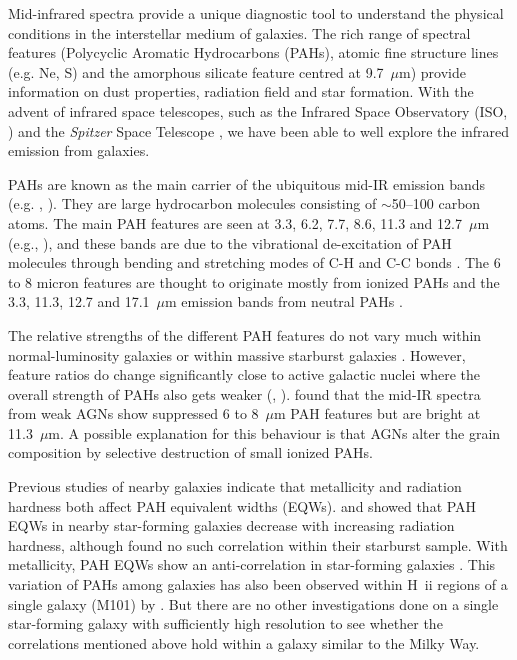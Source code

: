 Mid-infrared spectra provide a unique diagnostic tool to understand the physical conditions in the interstellar medium of galaxies. 
The rich range of spectral features (Polycyclic Aromatic Hydrocarbons (PAHs), atomic fine structure lines (e.g. Ne, S) and the
amorphous silicate feature centred at 9.7~$\mu$m) provide information on dust properties, radiation field and star formation. 
With the advent of infrared space telescopes, such as the Infrared Space Observatory (ISO, \citealt{Kessler1996}) and 
the {\em Spitzer} Space Telescope \citep{spitzer2004}, we have been able to well explore the infrared emission from galaxies. 

PAHs are known as the main carrier of the ubiquitous mid-IR emission bands (e.g. \citealt{Allamandola1989}, 
\citealt{Tielens2008}). They are large hydrocarbon molecules consisting of $\sim$50--100 carbon atoms. 
The main PAH features are seen at 3.3, 6.2, 7.7, 8.6, 11.3 and 12.7~$\mu $m (e.g.\citealt{Mattila1996}, \citealt{Peeters2002}), 
and these bands are due to the vibrational de-excitation of PAH molecules  through bending and stretching modes of C-H and C-C bonds \citep{Tielens:2005lr}. 
The 6 to 8 micron features are thought to originate mostly from ionized PAHs and the 3.3, 11.3, 12.7 and 17.1~$\mu$m 
emission bands from neutral PAHs \citep{Peeters2002}. 


The relative strengths of the different PAH features do not vary much within normal-luminosity galaxies \citep{Smith:2007lr} or within 
massive starburst galaxies \citep{Brandl2006}. However, feature ratios do change significantly close to active galactic nuclei where the overall
strength of PAHs also gets weaker (\citealt{Roche1991}, \citealt{Smith:2007lr}). \citet{Smith:2007lr}  found that the mid-IR 
spectra from weak AGNs show suppressed 6 to 8~$\mu$m PAH features but are bright at 11.3~$\mu$m. 
A possible explanation for this behaviour is that AGNs alter the grain composition by selective destruction of small ionized PAHs. 

 
Previous studies of nearby galaxies indicate that metallicity and radiation hardness both affect PAH equivalent widths (EQWs). 
\citet{Smith:2007lr} and \citet{Engelbracht_2008} showed that PAH EQWs in nearby star-forming galaxies  decrease with increasing radiation hardness,
although  \citet{Brandl2006} found no such correlation within their starburst sample.  With metallicity, PAH EQWs show an anti-correlation 
in star-forming galaxies \citep{Marble_2010}. This variation of PAHs among galaxies has also been observed within H~{\sc ii} regions 
of a single galaxy (M101) by \citet{Gordon:2008lr}. But there are no other investigations done on a single star-forming galaxy with 
sufficiently high resolution to see whether the correlations mentioned above hold within a galaxy similar to the Milky Way.

